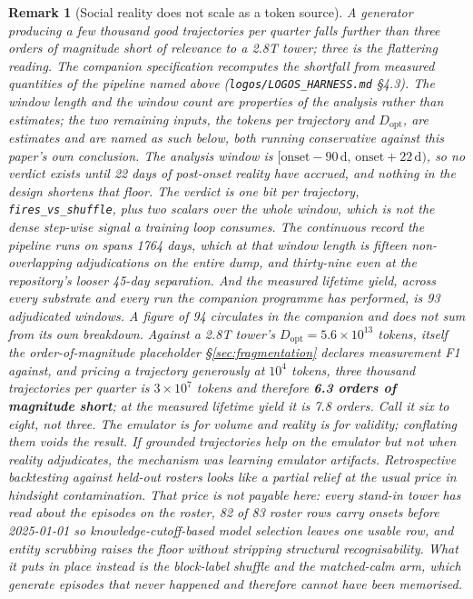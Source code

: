 \documentclass[11pt]{article}
\newtheorem{remark}{Remark}
\begin{document}
\begin{remark}[Social reality does not scale as a token source]
A generator producing a few thousand good trajectories per quarter falls further than three orders of magnitude short of relevance to a 2.8T tower; three is the flattering reading. The companion specification recomputes the shortfall from measured quantities of the pipeline named above (\texttt{logos/LOGOS\_HARNESS.md} \S4.3). The window length and the window count are properties of the analysis rather than estimates; the two remaining inputs, the tokens per trajectory and $D_{\mathrm{opt}}$, are estimates and are named as such below, both running conservative against this paper's own conclusion. The analysis window is $[\text{onset}-90\,\text{d},\,\text{onset}+22\,\text{d})$, so no verdict exists until 22 days of post-onset reality have accrued, and nothing in the design shortens that floor. The verdict is one bit per trajectory, \texttt{fires\_vs\_shuffle}, plus two scalars over the whole window, which is not the dense step-wise signal a training loop consumes. The continuous record the pipeline runs on spans 1764 days, which at that window length is fifteen non-overlapping adjudications on the entire dump, and thirty-nine even at the repository's looser 45-day separation. And the measured lifetime yield, across every substrate and every run the companion programme has performed, is 93 adjudicated windows. A figure of 94 circulates in the companion and does not sum from its own breakdown. Against a 2.8T tower's $D_{\mathrm{opt}} = 5.6\times10^{13}$ tokens, itself the order-of-magnitude placeholder \S\ref{sec:fragmentation} declares measurement F1 against, and pricing a trajectory generously at $10^4$ tokens, three thousand trajectories per quarter is $3\times10^{7}$ tokens and therefore \textbf{6.3 orders of magnitude short}; at the measured lifetime yield it is 7.8 orders. Call it six to eight, not three. The emulator is for volume and reality is for validity; conflating them voids the result. If grounded trajectories help on the emulator but not when reality adjudicates, the mechanism was learning emulator artifacts. Retrospective backtesting against held-out rosters looks like a partial relief at the usual price in hindsight contamination. That price is not payable here: every stand-in tower has read about the episodes on the roster, 82 of 83 roster rows carry onsets before 2025-01-01 so knowledge-cutoff-based model selection leaves one usable row, and entity scrubbing raises the floor without stripping structural recognisability. What it puts in place instead is the block-label shuffle and the matched-calm arm, which generate episodes that never happened and therefore cannot have been memorised.
\end{remark}
\end{document}
